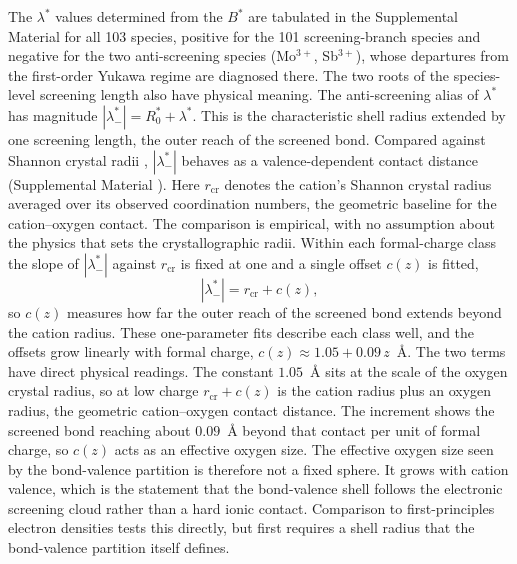 \documentclass[aps,prmaterials,twocolumn,10pt,superscriptaddress,floatfix]{revtex4-2}
\begin{document}
The $\lambda^*$ values determined from the $B^*$ are tabulated in
the Supplemental Material \cite{suppmat} for all 103 species,
positive for the 101 screening-branch species and negative for the
two anti-screening species (Mo$^{3+}$, Sb$^{3+}$), whose departures
from the first-order Yukawa regime are diagnosed there.  The two
roots of the species-level screening length also have physical
meaning.  The anti-screening alias of $\lambda^*$ has magnitude
$|\lambda^*_-|=R_0^*+\lambda^*$.  This is the characteristic shell
radius extended by one screening length, the outer reach of the
screened bond.  Compared against Shannon crystal radii
\cite{Shannon1976}, $|\lambda^*_-|$ behaves as a valence-dependent
contact distance (Supplemental Material \cite{suppmat}).  Here
$r_{\mathrm{cr}}$ denotes the cation's Shannon crystal radius
averaged over its observed coordination numbers, the geometric
baseline for the cation--oxygen contact.  The comparison is
empirical, with no assumption about the physics that sets the
crystallographic radii.  Within each formal-charge class the slope
of $|\lambda^*_-|$ against $r_{\mathrm{cr}}$ is fixed at one and a
single offset $c(z)$ is fitted,
\begin{equation*}
|\lambda^*_-|=r_{\mathrm{cr}}+c(z),
\end{equation*}
so $c(z)$ measures how far the outer reach of the screened bond
extends beyond the cation radius.  These one-parameter fits describe
each class well, and the offsets grow linearly with formal charge,
$c(z)\approx 1.05+0.09\,z$~\AA.  The two terms have direct physical
readings.  The constant $1.05$~\AA{} sits at the scale of the oxygen
crystal radius, so at low charge $r_{\mathrm{cr}}+c(z)$ is the
cation radius plus an oxygen radius, the geometric cation--oxygen
contact distance.  The increment shows the screened bond reaching
about $0.09$~\AA{} beyond that contact per unit of formal charge, so
$c(z)$ acts as an effective oxygen size.  The effective oxygen size
seen by the bond-valence partition is therefore not a fixed sphere.
It grows with cation valence, which is the statement that the
bond-valence shell follows the electronic screening cloud rather
than a hard ionic contact.  Comparison to first-principles electron
densities tests this directly, but first requires a shell
radius that the bond-valence partition itself defines.
\end{document}
